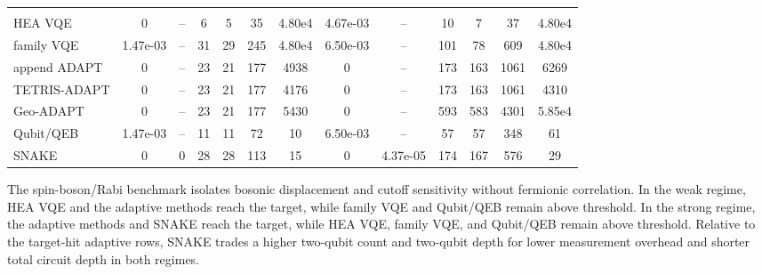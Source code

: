 \documentclass[
  reprint,
  amsmath,
  amssymb,
  aps,
  pra,
  nofootinbib,
  superscriptaddress,
  floatfix
]{revtex4-2}
\newcommand{\metrichead}[1]{\makebox[0.061\textwidth][c]{#1}}
\begin{document}
\begin{widetext}
\begin{minipage}{\textwidth}
\begin{center}
\begin{ruledtabular}
\begin{tabular}{p{}cccccc|cccccc}
 & \metrichead{$\delta E$} & \metrichead{$1-F$} & \metrichead{$N_{2q}$} & \metrichead{$D_{2q}$} & \metrichead{$D_c$} & \metrichead{$S$} & \metrichead{$\delta E$} & \metrichead{$1-F$} & \metrichead{$N_{2q}$} & \metrichead{$D_{2q}$} & \metrichead{$D_c$} & \metrichead{$S$}\\
\colrule
HEA VQE & 0 & -- & 6 & 5 & 35 & 4.80e4 & 4.67e-03 & -- & 10 & 7 & 37 & 4.80e4\\
family VQE & 1.47e-03 & -- & 31 & 29 & 245 & 4.80e4 & 6.50e-03 & -- & 101 & 78 & 609 & 4.80e4\\
append ADAPT & 0 & -- & 23 & 21 & 177 & 4938 & 0 & -- & 173 & 163 & 1061 & 6269\\
TETRIS-ADAPT & 0 & -- & 23 & 21 & 177 & 4176 & 0 & -- & 173 & 163 & 1061 & 4310\\
Geo-ADAPT & 0 & -- & 23 & 21 & 177 & 5430 & 0 & -- & 593 & 583 & 4301 & 5.85e4\\
Qubit/QEB & 1.47e-03 & -- & 11 & 11 & 72 & 10 & 6.50e-03 & -- & 57 & 57 & 348 & 61\\
SNAKE & 0 & 0 & 28 & 28 & 113 & 15 & 0 & 4.37e-05 & 174 & 167 & 576 & 29\\
\end{tabular}
\end{ruledtabular}
\end{center}
\end{minipage}
\par\addvspace{1.0ex}
The spin-boson/Rabi benchmark isolates bosonic displacement and cutoff sensitivity without fermionic correlation. In the weak regime, HEA VQE and the adaptive methods reach the target, while family VQE and Qubit/QEB remain above threshold. In the strong regime, the adaptive methods and SNAKE reach the target, while HEA VQE, family VQE, and Qubit/QEB remain above threshold. Relative to the target-hit adaptive rows, SNAKE trades a higher two-qubit count and two-qubit depth for lower measurement overhead and shorter total circuit depth in both regimes.


\end{widetext}
\end{document}
